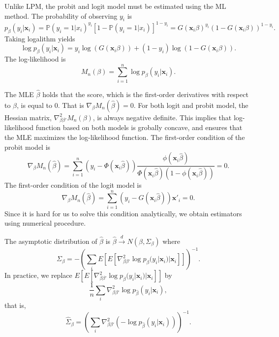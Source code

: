 \documentclass[
  12pt,
]{article}
\begin{document}
Unlike LPM, the probit and logit model must be estimated using the ML
method. The probability of observing \(y_i\) is \begin{equation*}
  p_{\beta}(y_i|\mathbf{x}_i)  
  = \mathbb{P}(y_i = 1 | x_i)^{y_i} [1 - \mathbb{P}(y_i = 1 | x_i)]^{1-y_i}
  = G(\mathbf{x}_i \beta)^{y_i} (1 - G(\mathbf{x}_i \beta))^{1-y_i}.
\end{equation*} Taking logalithm yields \begin{equation*}
  \log p_{\beta}(y_i|\mathbf{x}_i) = y_i \log(G(\mathbf{x}_i \beta)) + (1 - y_i)\log(1 - G(\mathbf{x}_i \beta)).
\end{equation*} The log-likelihood is \begin{equation*}
  M_n(\beta) = \sum_{i=1}^n \log p_{\beta}(y_i|\mathbf{x}_i).
\end{equation*}

The MLE \(\hat{\beta}\) holds that the score, which is the first-order
derivatives with respect to \(\beta\), is equal to 0. That is
\(\nabla_{\beta} M_n(\hat{\beta}) = 0\). For both logit and probit
model, the Hessian matrix, \(\nabla^2_{\beta\beta'} M_n(\beta)\), is
always negative definite. This implies that log-likelihood function
based on both models is grobally concave, and ensures that the MLE
maximizes the log-likelihood function. The first-order condition of the
probit model is \begin{equation*}
  \nabla_{\beta} M_n(\hat{\beta}) 
  = \sum_{i = 1}^n \left( y_i - \Phi(\mathbf{x}_i \hat{\beta}) \right) 
  \frac{\phi(\mathbf{x}_i \hat{\beta})}{\Phi(\mathbf{x}_i \hat{\beta})(1 - \phi(\mathbf{x}_i \hat{\beta}))} = 0.
\end{equation*} The first-order condition of the logit model is
\begin{equation*}
  \nabla_{\beta} M_n(\hat{\beta}) 
  = \sum_{i = 1}^n \left( y_i - G(\mathbf{x}_i \hat{\beta}) \right) \mathbf{x}'_i = 0.
\end{equation*} Since it is hard for us to solve this condition
analytically, we obtain estimators using numerical procedure.

The asymptotic distribution of \(\hat{\beta}\) is
\(\hat{\beta} \overset{d}{\to} N(\beta, \Sigma_{\beta})\) where
\begin{equation*}
  \Sigma_{\beta} = - \left( \sum_i E[E[ \nabla^2_{\beta\beta'} \log p_{\beta}(y_i | \mathbf{x}_i) | \mathbf{x}_i ]] \right)^{-1}.
\end{equation*} In practice, we replace
\(E[E[ \nabla^2_{\beta\beta'} \log p_{\beta}(y_i | \mathbf{x}_i) | \mathbf{x}_i ]]\)
by \begin{equation*}
  \frac{1}{n} \sum_i \nabla^2_{\beta\beta'} \log p_{\hat{\beta}}(y_i | \mathbf{x}_i),
\end{equation*} that is, \begin{equation*}
  \hat{\Sigma}_{\beta} = \left( \sum_i \nabla^2_{\beta\beta'} (-\log p_{\hat{\beta}}(y_i | \mathbf{x}_i)) \right)^{-1}.
\end{equation*}
\end{document}
